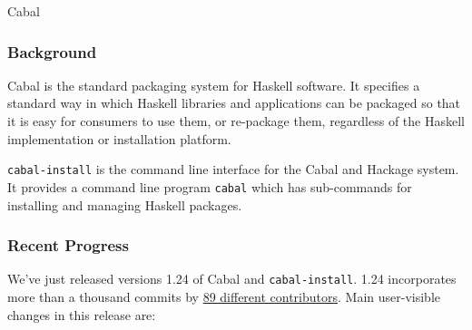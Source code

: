 \documentclass[DIV16,twocolumn,10pt]{scrreprt}
\begin{document}
\begin{hcarentry}{Cabal}
\makeheader

\subsubsection*{Background}

Cabal is the standard packaging system for Haskell software. It specifies a
standard way in which Haskell libraries and applications can be packaged so that
it is easy for consumers to use them, or re-package them, regardless of the
Haskell implementation or installation platform.

\texttt{cabal-install} is the command line interface for the Cabal and Hackage
system. It provides a command line program \texttt{cabal} which has sub-commands
for installing and managing Haskell packages.

\subsubsection*{Recent Progress}

We've just released versions 1.24 of Cabal and \texttt{cabal-install}. 1.24
incorporates more than a thousand commits by
\href{https://gist.github.com/23Skidoo/62544d7e0352037749eec7344788831c}{89
  different contributors}. Main user-visible changes in this release are:


\end{hcarentry}
\end{document}

